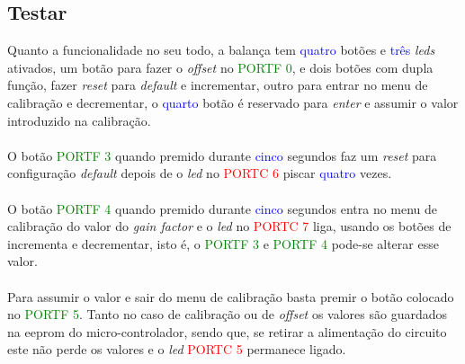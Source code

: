 \subsection{Testar}
Quanto a funcionalidade no seu todo, a balança tem \textcolor{blue}{quatro} botões e \textcolor{blue}{três} \textit{leds} ativados, um botão para fazer o \textit{offset} no \textcolor{green}{PORTF 0}, e dois botões com dupla função, fazer \textit{reset} para \textit{default} e incrementar, outro para entrar no menu de calibração e decrementar, o \textcolor{blue}{quarto} botão é reservado para \textit{enter} e assumir o valor introduzido na calibração.\\
\\
O botão \textcolor{green}{PORTF 3} quando premido durante \textcolor{blue}{cinco} segundos faz um \textit{reset} para configuração \textit{default} depois de o \textit{led} no \textcolor{red}{PORTC 6} piscar \textcolor{blue}{quatro} vezes.\\
\\
O botão \textcolor{green}{PORTF 4} quando premido durante \textcolor{blue}{cinco} segundos entra no menu de calibração do valor do \textit{gain factor} e o \textit{led} no \textcolor{red}{PORTC 7} liga, usando os botões de incrementa e decrementar, isto é, o
\textcolor{green}{PORTF 3} e \textcolor{green}{PORTF 4} pode-se alterar esse valor.\\
\\
Para assumir o valor e sair do menu de calibração basta premir o botão colocado no \textcolor{green}{PORTF 5}. Tanto no caso de calibração ou de \textit{offset} os valores são guardados na \acs{eeprom} do micro-controlador, sendo que, se retirar a alimentação do circuito este não perde os valores e o \textit{led} \textcolor{red}{PORTC 5} permanece ligado.
\\
\\

